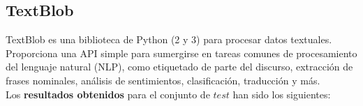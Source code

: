 \documentclass[a4paper,12pt]{report}
\begin{document}
\begin{table}[htbp!]
\centering
{}
\caption{Resultados para VaderSentiment}
\end{table}




\subsection{TextBlob}

{\setlength{\parindent}{0cm}
TextBlob es una biblioteca de Python (2 y 3) para procesar datos textuales. Proporciona una API simple para sumergirse en tareas comunes de procesamiento del lenguaje natural (NLP), como etiquetado de parte del discurso, extracción de frases nominales, análisis de sentimientos, clasificación, traducción y más.}
\vspace{2mm}\\
{\setlength{\parindent}{0cm}
Los \textbf{resultados obtenidos} para el conjunto de $test$ han sido los siguientes: }

\vspace{2mm}
\begin{table}[htbp!]
\centering
{}
\caption{Resultados para TextBlob}
\end{table}
\end{document}
